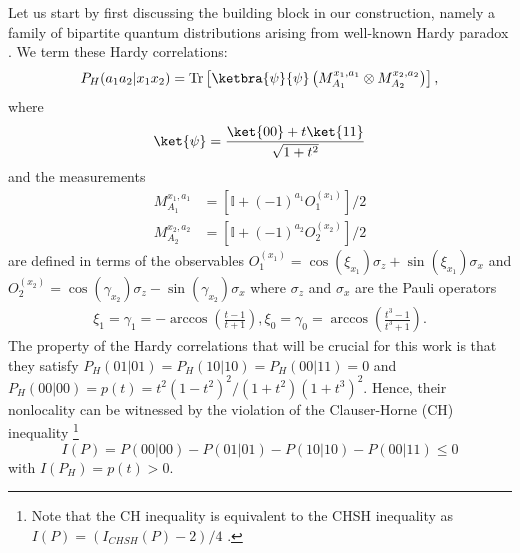 \documentclass[pra,aps,reprint,superscriptaddress]{revtex4-2}
\theoremstyle{theorem}
\begin{document}
Let us start by first discussing the building block in our construction, namely a family of bipartite quantum distributions arising from well-known Hardy paradox \cite{PhysRevLett.71.1665}. We term these Hardy correlations:
\begin{equation}\label{Eq: Born}
    P_H(a_1a_2|x_1x_2) = \text{Tr}\left[\ketbra{\psi}{\psi} \left(M_{A_1}^{x_1,a_1}\otimes M_{A_2}^{x_2,a_2}\right)\right], 
\end{equation}
where
\begin{equation}
    \ket{\psi} = \frac{\ket{00}+t\ket{11}}{\sqrt{1+t^2}}
\end{equation}
and the measurements 
\begin{align}\nonumber
    M_{A_1}^{x_1,a_1} &= \left[\mathbb{I}+(-1)^{a_1}O^{(x_1)}_1\right]/2\\\nonumber
    M_{A_2}^{x_2,a_2} &= \left[\mathbb{I}+(-1)^{a_2}O^{(x_2)}_2\right]/2
\end{align}
are defined in terms of the
 observables $O^{(x_1)}_1 = \cos(\xi_{x_1})\sigma_z + \sin(\xi_{x_1})\sigma_x$ and $O^{(x_2)}_2 = \cos(\gamma_{x_2})\sigma_z -\sin(\gamma_{x_2})\sigma_x$ where $\sigma_z$ and $\sigma_x$ are the Pauli operators 
\begin{align}\nonumber
    \xi_1 = \gamma_1 = -\arccos\left(\frac{t-1}{t+1}\right),\xi_0 = \gamma_0 = \arccos\left(\frac{t^3-1}{t^3+1}\right).
\end{align} 
The property of the Hardy correlations that will be crucial for this work is that they satisfy $P_H(01|01)=P_H(10|10)=P_H(00|11)=0$ and $P_H(00|00)=p(t)=t^2(1-t^2)^2/(1+t^2)(1+t^3)^2$. Hence, their nonlocality can be witnessed by the violation of the Clauser-Horne (CH) inequality \footnote{Note that the CH inequality is equivalent to the CHSH inequality as $I(P)=(I_{CHSH}(P)-2)/4$ \cite{Brunner_2014}.}
\begin{equation}\nonumber
    I(P)=P(00|00)-P(01|01)-P(10|10)-P(00|11)\leq 0
\end{equation} 
with $I(P_H)=p(t)>0$.
\end{document}

